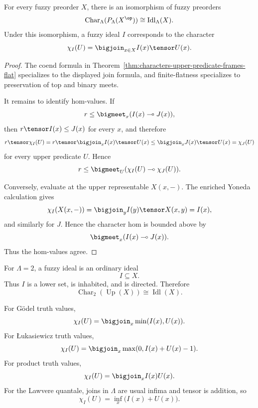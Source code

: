 \begin{theorem}
\label{thm:characters-upper-alexandrov-fuzzy-ideals}
For every fuzzy preorder \(X\), there is an isomorphism of fuzzy preorders
\[
    \operatorname{Char}_\Lambda(P_\Lambda(X^{\op}))
    \cong
    \operatorname{Idl}_\Lambda(X).
\]
Under this isomorphism, a fuzzy ideal \(I\) corresponds to the character
\[
    \chi_I(U)
    =
    \bigjoin_{x\in X}I(x)\tensor U(x).
\]
\end{theorem}

\begin{proof}
The coend formula in
Theorem~\ref{thm:characters-upper-predicate-frames-flat} specializes to the
displayed join formula, and finite-flatness specializes to preservation of top and
binary meets.

It remains to identify hom-values.  If
\[
    r\leq \bigmeet_x (I(x)\multimap J(x)),
\]
then \(r\tensor I(x)\leq J(x)\) for every \(x\), and therefore
\[
    r\tensor \chi_I(U)
    =
    r\tensor \bigjoin_x I(x)\tensor U(x)
    \leq
    \bigjoin_x J(x)\tensor U(x)
    =
    \chi_J(U)
\]
for every upper predicate \(U\).  Hence
\[
    r\leq
    \bigmeet_U(\chi_I(U)\multimap\chi_J(U)).
\]

Conversely, evaluate at the upper representable \(X(x,-)\).  The enriched Yoneda
calculation gives
\[
    \chi_I(X(x,-))
    =
    \bigjoin_y I(y)\tensor X(x,y)
    =
    I(x),
\]
and similarly for \(J\).  Hence the character hom is bounded above by
\[
    \bigmeet_x(I(x)\multimap J(x)).
\]
Thus the hom-values agree.
\end{proof}

\begin{example}
\label{ex:fuzzy-ideals-crisp}
For \(\Lambda=2\), a fuzzy ideal is an ordinary ideal
\[
    I\subseteq X.
\]
Thus \(I\) is a lower set, is inhabited, and is directed.  Therefore
\[
    \operatorname{Char}_2(\operatorname{Up}(X))
    \cong
    \operatorname{Idl}(X).
\]
\end{example}

\begin{example}
\label{ex:standard-fuzzy-ideals}
For G\"odel truth values,
\[
    \chi_I(U)=\bigjoin_x \min(I(x),U(x)).
\]
For {\L}ukasiewicz truth values,
\[
    \chi_I(U)
    =
    \bigjoin_x \max(0,I(x)+U(x)-1).
\]
For product truth values,
\[
    \chi_I(U)=\bigjoin_x I(x)U(x).
\]
For the Lawvere quantale, joins in \(\Lambda\) are usual infima and tensor is
addition, so
\[
    \chi_I(U)
    =
    \inf_x\bigl(I(x)+U(x)\bigr).
\]
\end{example}

